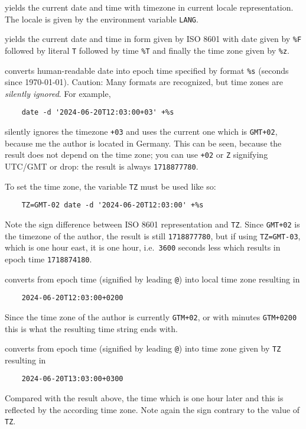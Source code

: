 \documentclass[a4paper, english]{article}%
\begin{document}
\begin{description}[style=nextline]
  \item[\texttt{date}] 
  yields the current date and time with timezone in current locale representation. 
  The locale is given by the environment variable \texttt{LANG}. 
  \item[\texttt{date +\%FT\%T\%z}] 
  yields the current date and time 
  in form given by ISO 8601 with date given by \texttt{\%F} followed by literal \texttt{T} 
  followed by time \texttt{\%T} and finally the time zone given by \texttt{\%z}. 
  \item[\texttt{date -d 'Apr 29 2024' +\%s}] 
  converts human-readable date into epoch time specified by format \texttt{\%s} (seconds since 1970-01-01). 
  Caution: Many formats are recognized, but time zones are \emph{silently ignored}. 
  For example, 
  \begin{verbatim}
    date -d '2024-06-20T12:03:00+03' +%s
  \end{verbatim}
  silently ignores the timezone \texttt{+03} 
  and uses the current one which is \texttt{GMT+02}, because me the author is located in Germany. 
  This can be seen, because the result does not depend on the time zone; 
  you can use \texttt{+02} or \texttt{Z} signifying UTC/GMT or drop: 
  the result is always \texttt{1718877780}. 
  
  To set the time zone, the variable \texttt{TZ} must be used like so: 
  \begin{verbatim}
    TZ=GMT-02 date -d '2024-06-20T12:03:00' +%s
  \end{verbatim}
  Note the sign difference between ISO 8601 representation and \texttt{TZ}. 
  Since \texttt{GMT+02} is the timezone of the author, the result is still \texttt{1718877780}, 
  but if using \texttt{TZ=GMT-03}, which is one hour east, 
  it is one hour, i.e.~\@ \texttt{3600} seconds less which results in epoch time \texttt{1718874180}. 
  \item[\texttt{date -d '@1718877780' +\%FT\%T\%z}] 
  converts from epoch time (signified by leading \texttt{@}) into local time zone resulting in 
  \begin{verbatim}
    2024-06-20T12:03:00+0200
  \end{verbatim}
  Since the time zone of the author is currently \texttt{GTM+02}, or with minutes \texttt{GTM+0200}
  this is what the resulting time string ends with. 
  \item[\texttt{TZ=GMT-03 date -d '@1718877780' +\%FT\%T\%z}] 
  converts from epoch time (signified by leading \texttt{@}) into time zone given by \texttt{TZ} resulting in 
  \begin{verbatim}
    2024-06-20T13:03:00+0300
  \end{verbatim}
  Compared with the result above, the time which is one hour later 
  and this is reflected by the according time zone. 
  Note again the sign contrary to the value of \texttt{TZ}. 
\end{description}
\end{document}
